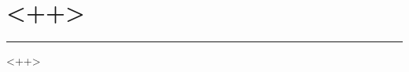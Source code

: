 \documentclass[titlepage]{article}
\title{}<++>
\date{<++>}
\author{<++>}
\begin{document}
\maketitle


\section{<++>}
\hrule
\vspace{5px}
<++>
\end{document}
